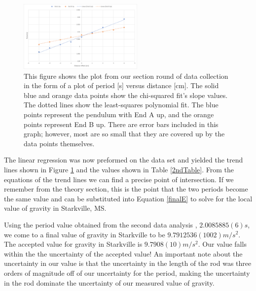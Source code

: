 \documentclass[aps,prl,10pt,twocolumn,floatfix]{revtex4-2}
\begin{document}
\begin{figure}
\includegraphics[width=230px]{SecondMeasurement.png}
\caption{This figure shows the plot from our section round of data collection in the form of a plot of period [s] versus distance [cm]. The solid blue and orange data points show the chi-squared fit's slope values. The dotted lines show the least-squares polynomial fit. The blue points represent the pendulum with End A up, and the orange points represent End B up. There are error bars included in this graph; however, most are so small that they are covered up by the data points themselves. }
\label{2stGraph}
\end{figure}

The linear regression was now preformed on the data set and yielded the trend lines shown in Figure \ref{2stGraph} and the values shown in Table \ref{2ndTable}.
From the equations of the trend lines we can find a precise point of intersection.
If we remember from the theory section, this is the point that the two periods become the same value and can be substituted into Equation \ref{finalE} to solve for the local value of gravity in Starkville, MS. 

Using the period value obtained from the second data analysis , $2.0085885(6)s$, we come to a final value of gravity in Starkville to be $9.7912536(1002)m/s^2$. 
The accepted value for gravity in Starkville is $9.7908(10)m/s^2$.
Our value falls within the the uncertainty of the accepted value!
An important note about the uncertainty in our value is that the uncertainty in the length of the rod was three orders of magnitude off of our uncertainty for the period, making the uncertainty in the rod dominate the uncertainty of our measured value of gravity.  
\end{document}
